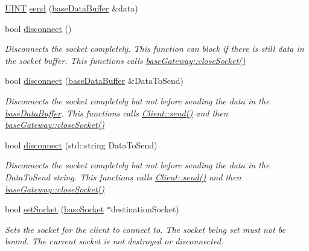 \begin{DoxyCompactItemize}
\hyperlink{typedefs_8h_a2e2c38961834f28c06e17e074eb00bc7}{U\+I\+N\+T} \hyperlink{class_communication_1_1_client_a90215215336f21e97829c17e76104ac6}{send} (\hyperlink{class_communication_1_1base_data_buffer}{base\+Data\+Buffer} \&data)
\item 
bool \hyperlink{class_communication_1_1_client_ab9a6013d31a6fd6a2365270bbe8ac207}{disconnect} ()
\begin{DoxyCompactList}\small\item\em Disconnects the socket completely. This function can block if there is still data in the socket buffer. This functions calls \hyperlink{class_communication_1_1base_gateway_a6d0f24de107a1e43bd2a41fe2ba421ba}{base\+Gateway\+::close\+Socket()} \end{DoxyCompactList}\item 
bool \hyperlink{class_communication_1_1_client_ae1b174c8884fca6e4104e672ec4127c9}{disconnect} (\hyperlink{class_communication_1_1base_data_buffer}{base\+Data\+Buffer} \&Data\+To\+Send)
\begin{DoxyCompactList}\small\item\em Disconnects the socket completely but not before sending the data in the \hyperlink{class_communication_1_1base_data_buffer}{base\+Data\+Buffer}. This functions calls \hyperlink{class_communication_1_1_client_a9f646713fab7ee53a86cc4391c65ba96}{Client\+::send()} and then \hyperlink{class_communication_1_1base_gateway_a6d0f24de107a1e43bd2a41fe2ba421ba}{base\+Gateway\+::close\+Socket()} \end{DoxyCompactList}\item 
bool \hyperlink{class_communication_1_1_client_aee5d02aa859d813a72a14ab2d39ea23d}{disconnect} (std\+::string Data\+To\+Send)
\begin{DoxyCompactList}\small\item\em Disconnects the socket completely but not before sending the data in the Data\+To\+Send string. This functions calls \hyperlink{class_communication_1_1_client_a9f646713fab7ee53a86cc4391c65ba96}{Client\+::send()} and then \hyperlink{class_communication_1_1base_gateway_a6d0f24de107a1e43bd2a41fe2ba421ba}{base\+Gateway\+::close\+Socket()} \end{DoxyCompactList}\item 
bool \hyperlink{class_communication_1_1_client_ac97183c35c7227c71dc43ed713efb8cb}{set\+Socket} (\hyperlink{class_communication_1_1base_socket}{base\+Socket} $\ast$destination\+Socket)
\begin{DoxyCompactList}\small\item\em Sets the socket for the client to connect to. The socket being set must not be bound. The current socket is not destroyed or disconnected. \end{DoxyCompactList}\item 

\end{DoxyCompactItemize}
